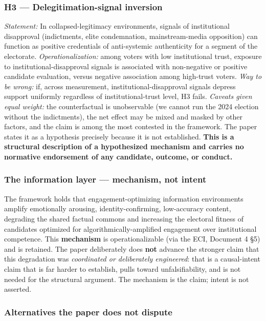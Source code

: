 \documentclass[
]{article}
\begin{document}
\subsubsection{H3 --- Delegitimation-signal
inversion}\label{h3-delegitimation-signal-inversion}

\emph{Statement:} In collapsed-legitimacy environments, signals of
institutional disapproval (indictments, elite condemnation,
mainstream-media opposition) can function as positive credentials of
anti-systemic authenticity for a segment of the electorate.
\emph{Operationalization:} among voters with low institutional trust,
exposure to institutional-disapproval signals is associated with
non-negative or positive candidate evaluation, versus negative
association among high-trust voters. \emph{Way to be wrong:} if, across
measurement, institutional-disapproval signals depress support uniformly
regardless of institutional-trust level, H3 fails. \emph{Caveats given
equal weight:} the counterfactual is unobservable (we cannot run the
2024 election without the indictments), the net effect may be mixed and
masked by other factors, and the claim is among the most contested in
the framework. The paper states it as a hypothesis precisely because it
is not established. \textbf{This is a structural description of a
hypothesized mechanism and carries no normative endorsement of any
candidate, outcome, or conduct.}

\subsubsection{The information layer --- mechanism, not
intent}\label{the-information-layer-mechanism-not-intent}

The framework holds that engagement-optimizing information environments
amplify emotionally arousing, identity-confirming, low-accuracy content,
degrading the shared factual commons and increasing the electoral
fitness of candidates optimized for algorithmically-amplified engagement
over institutional competence. This \textbf{mechanism} is
operationalizable (via the ECI, Document 4 §5) and is retained. The
paper deliberately does \textbf{not} advance the stronger claim that
this degradation was \emph{coordinated or deliberately engineered}: that
is a causal-intent claim that is far harder to establish, pulls toward
unfalsifiability, and is not needed for the structural argument. The
mechanism is the claim; intent is not asserted.

\subsubsection{Alternatives the paper does not
dispute}\label{alternatives-the-paper-does-not-dispute}
\end{document}
